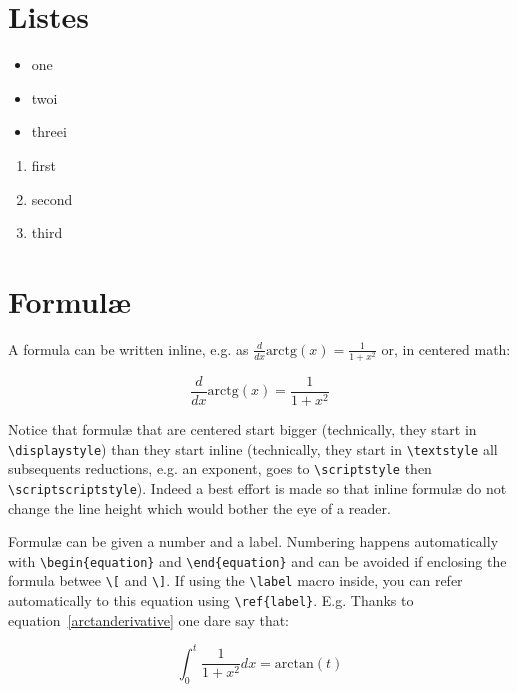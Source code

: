 \section{Listes}

\begin{itemize}
 \itemsep0pt
 \item one
 \item twoi
 \item threei
\end{itemize}

\begin{enumerate}
 \itemsep0pt
 \item first
 \item second
 \item third
\end{enumerate}


\section{Formulæ}

A formula can be written inline, e.g. as $ \frac{d}{dx}\mbox{arctg}(x) = \frac{1}{1+x^2}$ or, in centered math:

\begin{equation}  \frac{d}{dx}\mbox{arctg}(x) = \frac{1}{1+x^2} \label{arctanderivative}\end{equation}

Notice that formulæ that are centered start bigger (technically, they start in \verb+\displaystyle+) than they start inline (technically, they start in \verb+\textstyle+ all subsequents reductions, e.g. an exponent, goes to \verb+\scriptstyle+ then \verb+\scriptscriptstyle+). Indeed a best effort is made so that inline formulæ do not change the line height which would bother the eye of a reader.

Formulæ can be given a number and a label. Numbering happens automatically with \verb+\begin{equation}+ and \verb+\end{equation}+ and can be avoided if enclosing the formula betwee \verb+\[+ and \verb+\]+. If using the \verb+\label+ macro inside, you can refer automatically to this equation using \verb+\ref{label}+. E.g. Thanks to equation~\ref{arctanderivative} one dare say that:

\begin{equation} \int_0^t \frac{1}{1+x^2} dx = \mbox{arctan}(t) \end{equation}